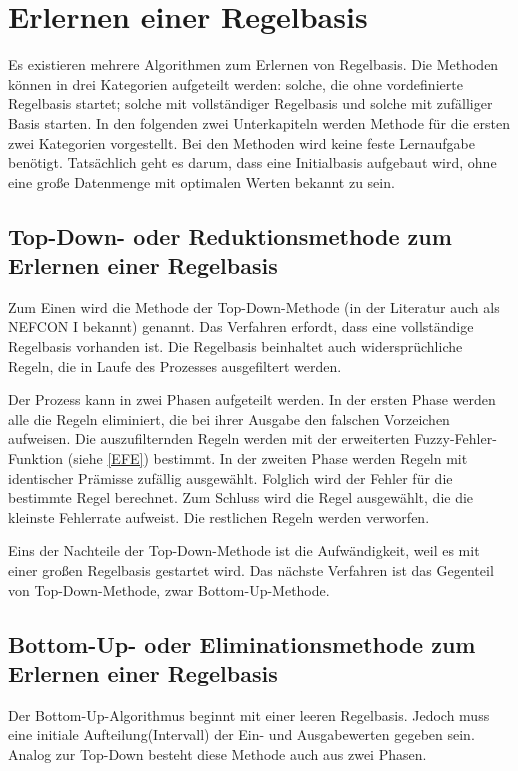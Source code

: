 \section{Erlernen einer Regelbasis}

Es existieren mehrere Algorithmen zum Erlernen von Regelbasis. Die Methoden können in drei Kategorien aufgeteilt werden: solche, die ohne vordefinierte Regelbasis startet; solche mit vollständiger Regelbasis und solche mit zufälliger Basis  starten. In den folgenden zwei Unterkapiteln werden Methode für die ersten zwei Kategorien vorgestellt. Bei den Methoden wird keine feste Lernaufgabe benötigt. Tatsächlich geht es darum, dass eine Initialbasis aufgebaut wird, ohne eine große Datenmenge mit optimalen Werten bekannt zu sein. \cite{CIKruse:15} \cite{UNIMAG:97}%

\subsection{Top-Down- oder Reduktionsmethode zum Erlernen einer Regelbasis}

Zum Einen wird die Methode der Top-Down-Methode (in der Literatur auch als NEFCON I bekannt) genannt. Das Verfahren erfordt, dass eine vollständige Regelbasis vorhanden ist. Die Regelbasis beinhaltet auch widersprüchliche Regeln, die in Laufe des Prozesses ausgefiltert werden.

Der Prozess kann in zwei Phasen aufgeteilt werden. In der ersten Phase werden alle die Regeln eliminiert, die bei ihrer Ausgabe den falschen Vorzeichen aufweisen. Die auszufilternden Regeln werden mit der erweiterten Fuzzy-Fehler-Funktion (siehe \ref{EFE}) bestimmt. In der zweiten Phase werden Regeln mit identischer Prämisse zufällig ausgewählt. Folglich wird der Fehler für die bestimmte Regel berechnet. Zum Schluss wird die Regel ausgewählt, die die kleinste Fehlerrate aufweist. Die restlichen Regeln werden verworfen.

Eins der Nachteile der Top-Down-Methode ist die Aufwändigkeit, weil es mit einer großen Regelbasis gestartet wird. Das nächste Verfahren ist das Gegenteil von Top-Down-Methode, zwar Bottom-Up-Methode. \cite{CIKruse:15}


\subsection{Bottom-Up- oder Eliminationsmethode zum Erlernen einer Regelbasis}

Der Bottom-Up-Algorithmus beginnt mit einer leeren Regelbasis. Jedoch muss eine initiale Aufteilung(Intervall) der Ein- und Ausgabewerten gegeben sein. Analog zur Top-Down besteht diese Methode auch aus zwei Phasen. 

